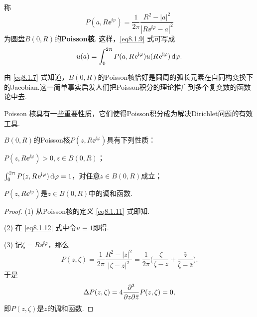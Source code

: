称
\begin{equation}\label{eq8.1.11}
P(a,R\ee^{\ii\varphi})=\frac1{2\pi}\frac{R^2-|a|^2}{|R\ee^{\ii\varphi}-a|^2}
\end{equation}
为圆盘$B(0,R)$的\textbf{Poisson核}. 这样，\eqref{eq8.1.9} 式可写成
\begin{equation}\label{eq8.1.12}
u(a)=\int_0^{2\uppi}P(a,R\operatorname{\!\!\;\mathrm e}^{\mathrm i\varphi})u(R\operatorname{\!\!\;\mathrm e}^{\mathrm i\varphi})\mathop{}\!\mathrm{d} \varphi.
\end{equation}

由 \eqref{eq8.1.7} 式知道，$B(0,R)$的Poisson核恰好是圆周的弧长元素在自同构变换下的Jacobian.这一简单事实启发人们把Poisson积分的理论推广到多个复变数的函数论中去.

Poisson 核具有一些重要性质，它们使得Poisson积分成为解决Dirichlet问题的有效工具.

\begin{prop}\label{prop8.1.6}
$B(0,R)$的Poisson核$P(z,R\ee^{\ii\varphi})$具有下列性质：
\begin{eenum}
\item \label{prop8.1.6.1} $P(z,R\ee^{\ii\varphi})>0,z\in B(0,R)$；
\item \label{prop8.1.6.2} $\int_0^{2\uppi}P(z,R\operatorname{\!\!\;\mathrm e}^{\mathrm i\varphi})\mathop{}\!\mathrm{d} \varphi=1$，对任意$z\in B(0,R)$成立；
\item \label{prop8.1.6.3} $P(z,R\ee^{\ii\varphi})$是$z\in B(0,R)$中的调和函数.
\end{eenum}
\end{prop}
\begin{proof}(1) 从Poisson核的定义 \eqref{eq8.1.11} 式即知.

(2) 在 \eqref{eq8.1.12} 式中令$u\equiv1$即得.

(3) 记$\zeta=R\ee^{\ii\varphi}$，那么
\[P(z,\zeta)=\frac1{2\pi}\frac{R^2-|z|^2}{|\zeta-z|^2}=\frac1{2\pi}
\bigg(\frac\zeta{\zeta-z}+\frac{\bar z}{\bar \zeta-\bar z}\bigg).\]
于是
\[\Delta P(z,\zeta)=4\frac{\partial^2 }{\partial z\partial {}\mkern2mu\overline{\mkern-2muz}}P(z,\zeta)=0,\]
即$P(z,\zeta)$是$z$的调和函数.
\end{proof}

